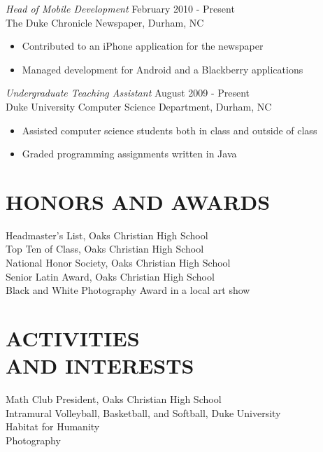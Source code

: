 \documentclass[line,margin]{res}
\begin{document}
\begin{resume}
	{\sl Head of Mobile Development} \hfill February 2010 - Present \\
        The Duke Chronicle Newspaper, Durham, NC
        \begin{itemize}  \itemsep -2pt %
        	\item Contributed to an iPhone application for the newspaper
			\item Managed development for Android and a Blackberry applications
        \end{itemize}

	{\sl Undergraduate Teaching Assistant} \hfill August 2009 - Present \\
        Duke University Computer Science Department, Durham, NC
        \begin{itemize}  \itemsep -2pt %
            \item Assisted computer science students both in class and outside of class
			\item Graded programming assignments written in Java
        \end{itemize}
                

\section{HONORS AND AWARDS}
	Headmaster's List, Oaks Christian High School \\
	Top Ten of Class, Oaks Christian High School \\
	National Honor Society, Oaks Christian High School \\
	Senior Latin Award, Oaks Christian High School \\
	Black and White Photography Award in a local art show

\section{ACTIVITIES \\ AND INTERESTS}             
 	Math Club President, Oaks Christian High School \\
	Intramural Volleyball, Basketball, and Softball, Duke University \\
	Habitat for Humanity \\
	Photography
\end{resume}
\end{document}
